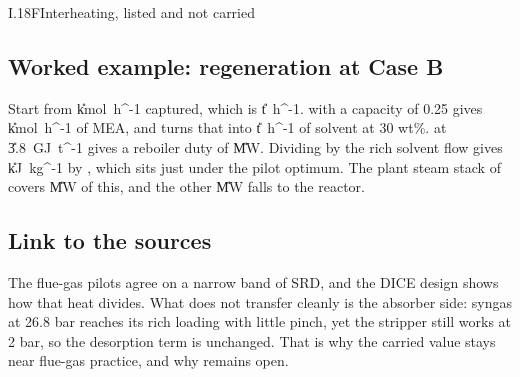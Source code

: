 \begin{eqcard}{I.18}{F}{Interheating, listed and not carried}
\end{eqcard}

\subsection*{Worked example: regeneration at Case B}
Start from \cCapC{} \U{kmol\ h^{-1}} captured, which is \vMcotwoB{} \U{t\ h^{-1}}.  with a capacity of 0.25 gives \cMeaKmol{} \U{kmol\ h^{-1}} of MEA, and  turns that into \vMsolvB{} \U{t\ h^{-1}} of solvent at 30 wt\%.  at \U{3.8\ GJ\ t^{-1}} gives a reboiler duty of \vQrebB{} \U{MW}. Dividing by the rich solvent flow gives \cStrInt{} \U{kJ\ kg^{-1}} by , which sits just under the pilot optimum. The plant steam stack of  covers \vQstackB{} \U{MW} of this, and the other \vQgapB{} \U{MW} falls to the reactor.

\subsection*{Link to the sources}
The flue-gas pilots agree on a narrow band of SRD, and the DICE design shows how that heat divides. What does not transfer cleanly is the absorber side: syngas at 26.8 bar reaches its rich loading with little pinch, yet the stripper still works at 2 bar, so the desorption term is unchanged. That is why the carried value stays near flue-gas practice, and why  remains open.
